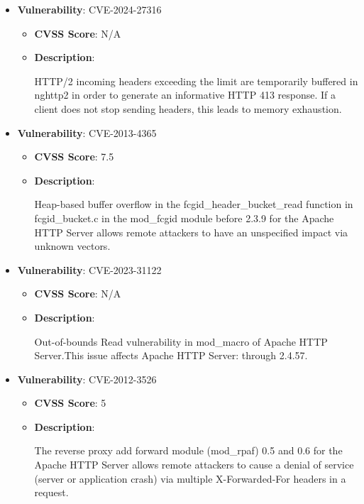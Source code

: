 \documentclass{article}
\begin{document}
\begin{itemize}
        \item \textbf{Vulnerability}: CVE-2024-27316
        \begin{itemize}
            \item \textbf{CVSS Score}:  N/A 
            \item \textbf{Description}:
            \parbox[t]{0.9\linewidth}{
                \ttfamily HTTP/2 incoming headers exceeding the limit are temporarily buffered in nghttp2 in order to generate an informative HTTP 413 response. If a client does not stop sending headers, this leads to memory exhaustion.
            }
        \end{itemize}
    
        \item \textbf{Vulnerability}: CVE-2013-4365
        \begin{itemize}
            \item \textbf{CVSS Score}:  7.5 
            \item \textbf{Description}:
            \parbox[t]{0.9\linewidth}{
                \ttfamily Heap-based buffer overflow in the fcgid\_header\_bucket\_read function in fcgid\_bucket.c in the mod\_fcgid module before 2.3.9 for the Apache HTTP Server allows remote attackers to have an unspecified impact via unknown vectors.
            }
        \end{itemize}
    
        \item \textbf{Vulnerability}: CVE-2023-31122
        \begin{itemize}
            \item \textbf{CVSS Score}:  N/A 
            \item \textbf{Description}:
            \parbox[t]{0.9\linewidth}{
                \ttfamily Out-of-bounds Read vulnerability in mod\_macro of Apache HTTP Server.This issue affects Apache HTTP Server: through 2.4.57.
            }
        \end{itemize}
    
        \item \textbf{Vulnerability}: CVE-2012-3526
        \begin{itemize}
            \item \textbf{CVSS Score}:  5 
            \item \textbf{Description}:
            \parbox[t]{0.9\linewidth}{
                \ttfamily The reverse proxy add forward module (mod\_rpaf) 0.5 and 0.6 for the Apache HTTP Server allows remote attackers to cause a denial of service (server or application crash) via multiple X-Forwarded-For headers in a request.
            }
        \end{itemize}
    

\end{itemize}
\end{document}

